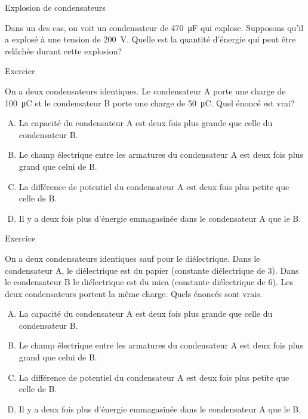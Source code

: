 \documentclass{beamer}
\begin{document}
\begin{frame}{Explosion de condensateurs}

Dans un des cas, on voit un condensateur de \SI{470}{\micro\farad} qui explose.
Supposons qu'il a explosé à une tension de \SI{200}{\volt}. Quelle est la
quantité d'énergie qui peut être relâchée durant cette explosion?

\end{frame}



\begin{frame}{Exercice}

On a deux condensateurs identiques. Le condensateur A porte une charge de
\SI{100}{\micro\coulomb} et le condensateur B porte une charge de
\SI{50}{\micro\coulomb}. Quel énoncé est vrai?

\begin{enumerate}[A.]
  \item La capacité du condensateur A est deux fois plus grande que celle du
    condensateur B.
  \item<alert@2> Le champ électrique entre les armatures du condensateur A est
    deux fois plus grand que celui de B.
  \item La différence de potentiel du condensateur A est deux fois plus petite
    que celle de B.
  \item Il y a deux fois plus d'énergie emmagasinée dans le condensateur A que
    le B.
\end{enumerate}

\end{frame}



\begin{frame}{Exercice}

On a deux condensateurs identiques sauf pour le diélectrique. Dans le
condensateur A, le diélectrique est du papier (constante diélectrique de 3).
Dans le condensateur B le diélectrique est du mica (constante diélectrique de
6). Les deux condensateurs portent la même charge. Quels énoncés sont vrais.

\begin{enumerate}[A.]
  \item La capacité du condensateur A est deux fois plus grande que celle du
    condensateur B.
  \item<alert@2>  Le champ électrique entre les armatures du condensateur A est
    deux fois plus grand que celui de B.
  \item La différence de potentiel du condensateur A est deux fois plus petite
    que celle de B.
  \item<alert@2> Il y a deux fois plus d'énergie emmagasinée dans le
    condensateur A que le B.
\end{enumerate}

\end{frame}
\end{document}
